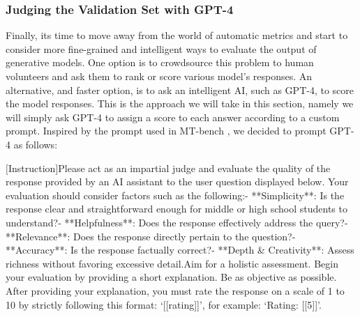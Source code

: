 \documentclass[11pt, oneside]{article}   	%
\begin{document}
\subsubsection{Judging the Validation Set with GPT-4}
Finally, its time to move away from the world of automatic metrics and start to consider more fine-grained and intelligent ways to evaluate the output of generative models.
One option is to crowdsource this problem to human volunteers and ask them to rank or score various model's responses.
An alternative, and faster option, is to ask an intelligent AI, such as GPT-4, to score the model responses. 
This is the approach we will take in this section, namely we will simply ask GPT-4 to assign a score to each answer according to a custom prompt.
Inspired by the prompt used in MT-bench \cite{zheng2023judging}, we decided to prompt GPT-4 as follows:
\\
\begin{displayquote}
$[$Instruction$]$\newline Please act as an impartial judge and
    evaluate the quality of the response provided by an AI assistant
    to the user question displayed below. Your evaluation should consider
    factors such as the following:\newline\newline- **Simplicity**: Is the response
    clear and straightforward enough for middle or high school students to
    understand?\newline- **Helpfulness**: Does the response effectively address
    the query?\newline- **Relevance**: Does the response directly pertain to the
    question?\newline- **Accuracy**: Is the response factually correct?\newline-
    **Depth \& Creativity**: Assess richness without favoring excessive
    detail.\newline\newline Aim for a holistic assessment. Begin your evaluation by
    providing a short explanation. Be as objective as possible. After
    providing your explanation, you must rate the response on a scale
    of 1 to 10 by strictly following this format: `[[rating]]',
    for example: `Rating: [[5]]'.\newline\newline[Question]\newline{}
\end{displayquote}
\end{document}

